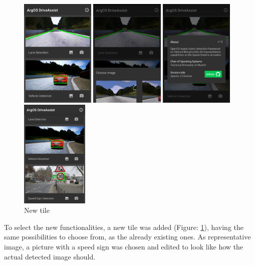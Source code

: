 \begin{figure}[H]
	\includegraphics[height=5.2cm]{images/screenshot_main.png}
	\caption{Main screen}\label{fig:main_screen}
	\endminipage\hfill
	\includegraphics[height=5.2cm]{images/screenshot_load_image.png}
	\caption{Load\newline Image}\label{fig:load_image}
	\endminipage\hfill
	\includegraphics[height=5.2cm]{images/screenshot_about.png}
	\caption{About \newline infos}\label{fig:about}
	\endminipage\hfill
	\includegraphics[height=5.2cm]{images/screenshot_new.png}
	\caption{New \newline tile}\label{fig:new}
	\endminipage
\end{figure}
To select the new functionalities, a new tile was added (Figure: \ref{fig:new}), having the same possibilities to choose from, as the already existing ones. As representative image, a picture with a speed sign was chosen and edited to look like how the actual detected image should. 







